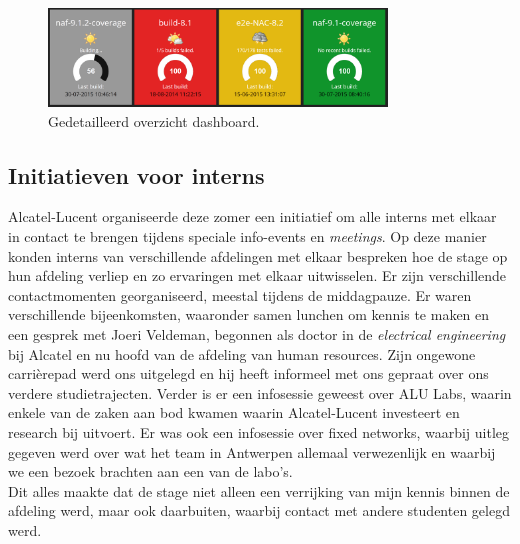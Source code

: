 \documentclass[10pt,a4paper]{article}
\begin{document}
\begin{figure}[ht!]
\centering
\includegraphics[width=90mm]{screenshot2.png}
\caption{Gedetailleerd overzicht dashboard.} 
\label{dash_2}
\end{figure}

\subsection{Initiatieven voor interns }
\label{interns}
Alcatel-Lucent organiseerde deze zomer een initiatief om alle interns met elkaar in contact te brengen tijdens speciale info-events en \textit{meetings}. Op deze manier konden interns van verschillende afdelingen met elkaar bespreken hoe de stage op hun afdeling verliep en zo ervaringen met elkaar uitwisselen. Er zijn verschillende contactmomenten georganiseerd, meestal tijdens de middagpauze. Er waren verschillende bijeenkomsten, waaronder samen lunchen om kennis te maken en een gesprek met Joeri Veldeman, begonnen als doctor in de \textit{electrical engineering} bij Alcatel en nu hoofd van de afdeling van human resources. Zijn ongewone carri\`erepad werd ons uitgelegd en hij heeft informeel met ons gepraat over ons verdere studietrajecten.
Verder is er een infosessie geweest over ALU Labs, waarin enkele van de zaken aan bod kwamen waarin Alcatel-Lucent investeert en research bij uitvoert. Er was ook een infosessie over fixed networks, waarbij uitleg gegeven werd over wat het team in Antwerpen allemaal verwezenlijk en waarbij we een bezoek brachten aan een van de labo's.\\
Dit alles maakte dat de stage niet alleen een verrijking van mijn kennis binnen de afdeling werd, maar ook daarbuiten, waarbij contact met andere studenten gelegd werd.
\end{document}
